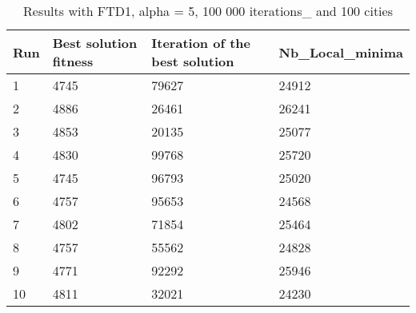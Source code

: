 \documentclass[12pt,oneside,a4paper]{article}
\begin{document}
\begin{table}[h]
  \centering
  \small
  \begin{tabular}{llll}
    \hline
    \multicolumn{1}{|l|}{\textbf{Run}}& \multicolumn{1}{l|}{\textbf{Best solution fitness}}& \multicolumn{1}{l|}{\textbf{Iteration of the best solution}}& \multicolumn{1}{l|}{\textbf{Nb\_Local\_minima}}\\ \hline
    \multicolumn{1}{|l|}{1} & \multicolumn{1}{l|}{4745}  & \multicolumn{1}{l|}{79627} & \multicolumn{1}{l|}{24912}  \\ \hline
    \multicolumn{1}{|l|}{2} & \multicolumn{1}{l|}{4886}  & \multicolumn{1}{l|}{26461} & \multicolumn{1}{l|}{26241}  \\ \hline
    \multicolumn{1}{|l|}{3} & \multicolumn{1}{l|}{4853}  & \multicolumn{1}{l|}{20135}  & \multicolumn{1}{l|}{25077}  \\ \hline
    \multicolumn{1}{|l|}{4} & \multicolumn{1}{l|}{4830}  & \multicolumn{1}{l|}{99768}  & \multicolumn{1}{l|}{25720}  \\ \hline
    \multicolumn{1}{|l|}{5} & \multicolumn{1}{l|}{4745}  & \multicolumn{1}{l|}{96793}  & \multicolumn{1}{l|}{25020}  \\ \hline
    \multicolumn{1}{|l|}{6} & \multicolumn{1}{l|}{4757}  & \multicolumn{1}{l|}{95653}  & \multicolumn{1}{l|}{24568}  \\ \hline
    \multicolumn{1}{|l|}{7} & \multicolumn{1}{l|}{4802}  & \multicolumn{1}{l|}{71854}  & \multicolumn{1}{l|}{25464}  \\ \hline
    \multicolumn{1}{|l|}{8} & \multicolumn{1}{l|}{4757}  & \multicolumn{1}{l|}{55562} & \multicolumn{1}{l|}{24828}  \\ \hline
    \multicolumn{1}{|l|}{9} & \multicolumn{1}{l|}{4771}  & \multicolumn{1}{l|}{92292} & \multicolumn{1}{l|}{25946}  \\ \hline
    \multicolumn{1}{|l|}{10} & \multicolumn{1}{l|}{4811}  & \multicolumn{1}{l|}{32021} & \multicolumn{1}{l|}{24230}  \\ \hline
  \end{tabular}
  \caption{Results with FTD1, alpha = 5, 100 000 iterations\_ and 100 cities}
\end{table}
\end{document}
